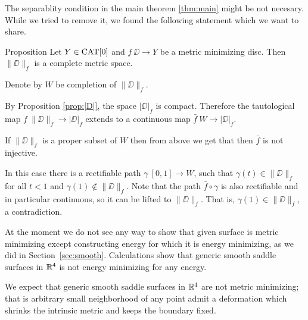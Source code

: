\documentclass[a4paper,10pt]{amsart}
\begin{document}
The separablity condition in the main theorem \ref{thm:main}
might be not necesary.
While we tried to remove it, we found the following statement 
which we want to share.

\begin{thm}{Proposition}
Let $Y\in\mathop{\rm CAT}\nolimits[0]$ 
and 
$f\:\DD\to Y$ be a metric minimizing disc.
Then $\|\DD\|_f$ is a complete metric space.
\end{thm}

Denote by $W$ be completion of $\|\DD\|_f$.

By Proposition \ref{prop:|D|},
the space $|\DD|_f$ is compact.
Therefore the tautological map $f\:\|\DD\|_f\to |\DD|_f$ 
extends to a continuous map $\bar f\:W\to |\DD|_f$.

If $\|\DD\|_f$ is a proper subset of $W$ 
then from above we get that
then $\bar f$ is not injective.

In this case there is a rectifiable path $\gamma\:[0,1]\to W$,
such that $\gamma(t)\in\|\DD\|_f$ for all $t<1$ and $\gamma(1)\notin \|\DD\|_f$.
Note that the path $\bar f\circ \gamma$ is also rectifiable and in particular continuous, so it can be lifted to $\|\DD\|_f$.
That is, $\gamma(1)\in \|\DD\|_f$, a contradiction.
\qeds

At the moment we do not see any way to show that given surface is metric minimizing except constructing energy for which it is energy minimizing, as we did in Section~\ref{sec:smooth}.
Calculations show that generic smooth saddle surfaces in $\mathbb{R}^4$ is not energy minimizing for any energy.

We expect that generic smooth saddle surfaces in $\mathbb{R}^4$ are not metric minimizing; that is arbitrary small neighborhood of any point admit a deformation which shrinks the intrinsic metric and keeps the boundary fixed.
\end{document}
